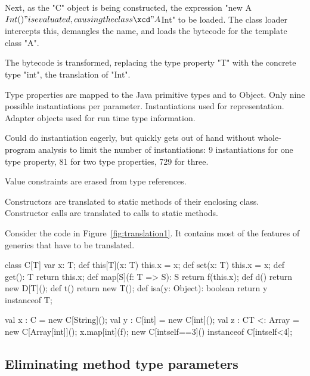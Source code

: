 \documentclass[preprint,nocopyrightspace,9pt]{sigplanconf}
\begin{document}
Next, as the \xcd"C" object is being constructed, the expression
\xcd"new A$Int()" is evaluated, causing the class \xcd"A$Int" to
be loaded.  The class loader intercepts
this, demangles the name, and loads the bytecode for the
template class \xcd"A".

The bytecode is transformed, replacing the type property \xcd"T"
with the concrete type \xcd"int", the translation of \xcd"Int".


Type properties are mapped to the Java primitive types and to
Object.  Only nine possible instantiations per parameter.
Instantiations used for representation.
Adapter objects used for run time type information.

Could do instantiation eagerly, but quickly gets out of hand without
whole-program analysis to limit the number of instantiations: 9
instantiations for one type property, 81 for two type
properties, 729 for three.

Value constraints are erased from type references.

Constructors are translated to static methods of their enclosing
class.
Constructor calls
are translated to calls to static methods.


Consider the code in Figure~\ref{fig:translation1}.  It contains most of the
features of generics that have to be translated.
\begin{figure*}[tp]
\begin{xten}
class C[T] {
    var x: T;
    def this[T](x: T) { this.x = x; }
    def set(x: T) { this.x = x; }
    def get(): T { return this.x; }
    def map[S](f: T => S): S { return f(this.x); }
    def d() { return new D[T](); }
    def t() { return new T(); }
    def isa(y: Object): boolean { return y instanceof T; }
}

val x : C = new C[String]();
val y : C[int] = new C[int]();
val z : C{T <: Array} = new C[Array[int]]();
x.map[int](f);
new C[int{self==3}]() instanceof C[int{self<4}];
\end{xten}
\caption{Code to translate}
\label{fig:translation1}
\end{figure*}

\subsection{Eliminating method type parameters}
\end{document}
